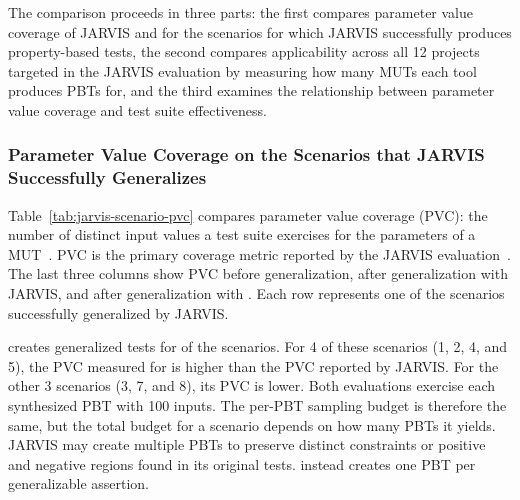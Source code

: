 
The comparison proceeds in three parts:
the first compares parameter value coverage
of JARVIS and \ToolTeralizer{} for the \TzRqzeroTabletwoReportedRows{} scenarios
for which JARVIS successfully produces property-based tests,
the second compares applicability
across all 12 projects targeted in the JARVIS evaluation
by measuring how many MUTs each tool produces PBTs for,
and the third examines the relationship
between parameter value coverage and test suite effectiveness.

\subsubsection{Parameter Value Coverage on the Scenarios that JARVIS Successfully Generalizes}%
\label{sec:jarvis-scenario-pvc}

Table~\ref{tab:jarvis-scenario-pvc} compares parameter value coverage (PVC):
the number of distinct input values a test suite exercises
for the parameters of a MUT~\cite{sampath_2008_prioritizing}.
PVC is the primary coverage metric reported by the JARVIS evaluation~\cite{peleg_2018_jarvis}.
The last three columns show PVC before generalization,
after generalization with JARVIS,
and after generalization with \ToolTeralizer{}.
Each row represents one of the \TzRqzeroTabletwoReportedRows{} scenarios
successfully generalized by JARVIS.

\ToolTeralizer{} creates generalized tests for
\TzRqzeroTabletwoSoundTabletwoRows{} of the
\TzRqzeroTabletwoReportedRows{} scenarios.
For 4 of these \TzRqzeroTabletwoReportedRows{} scenarios (1, 2, 4, and 5),
the PVC measured for \ToolTeralizer{} is higher than the PVC reported by JARVIS.
For the other 3 scenarios (3, 7, and 8), its PVC is lower.
Both evaluations exercise each synthesized PBT with 100 inputs.
The per-PBT sampling budget is therefore the same,
but the total budget for a scenario depends on how many PBTs it yields.
JARVIS may create multiple PBTs to preserve distinct constraints
or positive and negative regions found in its original tests.
\ToolTeralizer{} instead creates one PBT per generalizable assertion.

